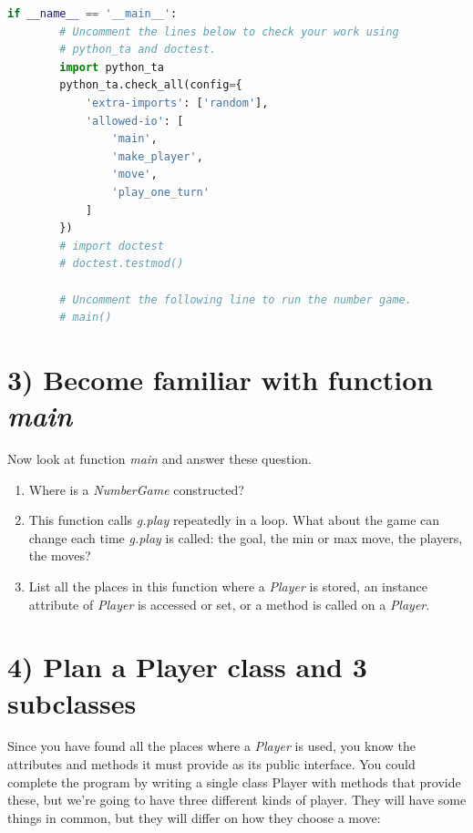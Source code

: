 \documentclass[12pt]{article}
\begin{document}
\begin{lstlisting}[language=Python,caption={lab3.py},captionpos=b]
    if __name__ == '__main__':
        # Uncomment the lines below to check your work using
        # python_ta and doctest.
        import python_ta
        python_ta.check_all(config={
            'extra-imports': ['random'],
            'allowed-io': [
                'main',
                'make_player',
                'move',
                'play_one_turn'
            ]
        })
        # import doctest
        # doctest.testmod()

        # Uncomment the following line to run the number game.
        # main()

\end{lstlisting}

\section*{3) Become familiar with function \textit{main}}

\bigskip

Now look at function \textit{main} and answer these question.

\begin{enumerate}[1.]
    \item Where is a \textit{NumberGame} constructed?
    \item This function calls \textit{g.play} repeatedly in a loop. What about the
    game can change each time \textit{g.play} is called: the goal, the min or max
    move, the players, the moves?
    \item List all the places in this function where a \textit{Player} is stored,
    an instance attribute of \textit{Player} is accessed or set, or a method is
    called on a \textit{Player}.
\end{enumerate}

\bigskip

\section*{4) Plan a Player class and 3 subclasses}

\bigskip

\noindent Since you have found all the places where a \textit{Player} is used, you know the
attributes and methods it must provide as its public interface. You could complete
the program by writing a single class Player with methods that provide these, but
we’re going to have three different kinds of player. They will have some things
in common, but they will differ on how they choose a move:
\end{document}
